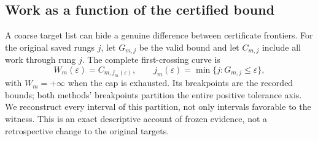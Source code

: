 

\subsection{Work as a function of the certified bound}
A coarse target list can hide a genuine difference between certificate frontiers. For the original saved rungs $j$, let $G_{m,j}$ be the valid bound and let $C_{m,j}$ include all work through rung $j$. The complete first-crossing curve is
\begin{equation}\label{eq:frontier47}
 W_m(\varepsilon)=C_{m,j_m(\varepsilon)},\qquad
 j_m(\varepsilon)=\min\{j:G_{m,j}\le\varepsilon\},
\end{equation}
with $W_m=+\infty$ when the cap is exhausted. Its breakpoints are the recorded bounds; both methods' breakpoints partition the entire positive tolerance axis. We reconstruct every interval of this partition, not only intervals favorable to the witness. This is an exact descriptive account of frozen evidence, not a retrospective change to the original targets.




